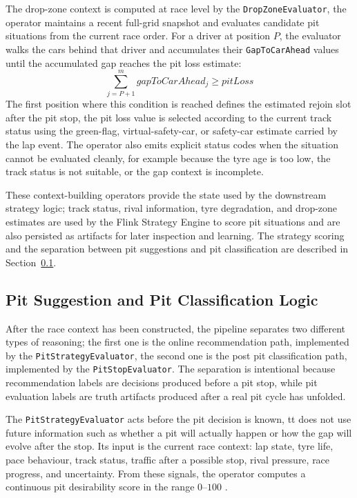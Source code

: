 The drop-zone context is computed at race level by the \texttt{DropZoneEvaluator}, the operator maintains a recent full-grid snapshot and evaluates candidate pit situations
from the current race order. For a driver at position $P$, the evaluator walks the cars behind that driver and accumulates their \texttt{GapToCarAhead} values until the
accumulated gap reaches the pit loss estimate:
\[
    \sum_{j=P+1}^{m} gapToCarAhead_j \geq pitLoss
\]
The first position where this condition is reached defines the estimated rejoin slot after the pit stop, the pit loss value is selected according to the current track status 
using the green-flag, virtual-safety-car, or safety-car estimate carried by the lap event. The operator also emits explicit status codes when the situation cannot be evaluated
cleanly, for example because the tyre age is too low, the track status is not suitable, or the gap context is incomplete.

These context-building operators provide the state used by the downstream strategy logic; track status, rival information, tyre degradation, and drop-zone estimates are used by
the Flink Strategy Engine to score pit situations and are also persisted as artifacts for later inspection and learning. The strategy scoring and the separation between pit
suggestions and pit classification are described in Section~\ref{sec:pit_suggestion_and_classification}.


\subsection{Pit Suggestion and Pit Classification Logic}
\label{sec:pit_suggestion_and_classification}

After the race context has been constructed, the pipeline separates two different types of reasoning; the first one is the online recommendation path, implemented by the
\texttt{PitStrategyEvaluator}, the second one is the post pit classification path, implemented by the \texttt{PitStopEvaluator}. The separation is intentional because recommendation
labels are decisions produced before a pit stop, while pit evaluation labels are truth artifacts produced after a real pit cycle has unfolded.

The \texttt{PitStrategyEvaluator} acts before the pit decision is known, tt does not use future information such as whether a pit will actually happen or how the gap will
evolve after the stop. Its input is the current race context: lap state, tyre life, pace behaviour, track status, traffic after a possible stop, rival pressure, race progress,
and uncertainty. From these signals, the operator computes a continuous pit desirability score in the range $0$--$100$ \cite{heilmeier2020race,carrasco2023optimization}.

